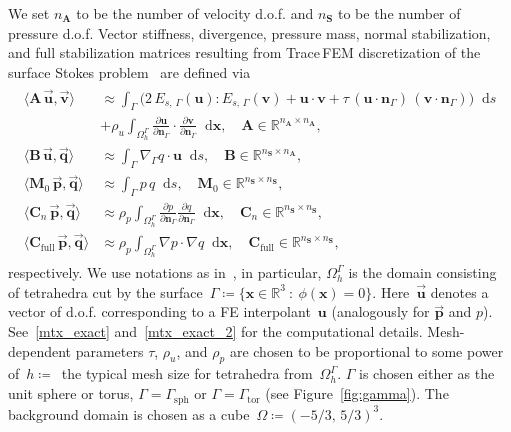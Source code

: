 \documentclass[12pt]{article}
\newcommand{\vect}[1]{\boldsymbol{\mathbf{#1}}}
\newcommand*\diff{\mathop{}\!\mathrm{d}}
\newcommand{\sphere}{{\Gamma_{\text{sph}}}}
\newcommand{\tor}{{\Gamma_{\text{tor}}}}
\begin{document}
We set $n_{\vect A}$ to be the number of velocity d.o.f. and $n_{\vect S}$ to be the number of pressure d.o.f. Vector stiffness, divergence, pressure mass, normal stabilization, and full stabilization matrices resulting from Trace\,FEM discretization of the surface Stokes problem~\cite{surfstokes} are defined via
\begin{align}\begin{split}\label{mtx}
	\langle \vect A\,\vec{\vect u}, \vec{\vect v} \rangle &\approx 
		\int_{\Gamma} \big( 2\,E_{s,\,\Gamma}(\vect u) : E_{s,\,\Gamma}(\vect v) + \vect u\cdot\vect v + \tau\,(\vect u\cdot\vect n_\Gamma)\,(\vect v\cdot\vect n_\Gamma) \big) \diff{s} \\
	&+ 
		\rho_u \int_{\Omega_h^{\Gamma}} \frac{\partial \vect u}{\partial\vect n_\Gamma}\cdot\frac{\partial \vect v}{\partial\vect n_\Gamma} \diff{\vect x}, \quad \vect A \in \mathbb R^{n_{\vect A} \times n_{\vect A}},\\
	\langle \vect B\,\vec{\vect u}, \vec{\vect q} \rangle &\approx 
		\int_{\Gamma} \nabla_\Gamma q \cdot \vect u \diff{s}, \quad \vect B \in \mathbb R^{n_{\vect S} \times n_{\vect A}},\\
	\langle \vect M_0\,\vec{\vect p}, \vec{\vect q} \rangle &\approx
		\int_{\Gamma} p\,q \diff{s}, \quad \vect M_0 \in \mathbb R^{n_{\vect S} \times n_{\vect S}},\\
	\langle \vect C_n\,\vec{\vect p}, \vec{\vect q} \rangle &\approx
		\rho_p \int_{\Omega^{\Gamma}_h} \frac{\partial p}{\partial\vect n_\Gamma} \frac{\partial q}{\partial\vect n_\Gamma} \diff{\vect x}, \quad \vect C_n \in \mathbb R^{n_{\vect S} \times n_{\vect S}},\\
	\langle \vect C_{\text{full}}\,\vec{\vect p}, \vec{\vect q} \rangle &\approx
		\rho_p \int_{\Omega^{\Gamma}_h} \nabla p \cdot \nabla q \diff{\vect x}, \quad \vect C_{\text{full}} \in \mathbb R^{n_{\vect S} \times n_{\vect S}},		 
\end{split}\end{align}
respectively. We use notations as in~\cite{surfstokes}, in particular, $\Omega^\Gamma_h$ is the domain consisting of tetrahedra cut by the surface~$\Gamma \coloneqq \{ \vect x \in \mathbb{R}^3\::\:\phi(\vect x) = 0\}$. Here~$\vec{\vect u}$ denotes a vector of d.o.f. corresponding to a FE interpolant~$\vect u$ (analogously for $\vec{\vect p}$ and $p$). See~\eqref{mtx_exact} and~\eqref{mtx_exact_2} for the computational details. Mesh-dependent parameters $\tau$, $\rho_u$, and $\rho_p$ are chosen to be proportional to some power of~$h \coloneqq$~the typical mesh size for tetrahedra from~$\Omega^{\Gamma}_h$. $\Gamma$ is chosen either as the unit sphere or torus, $\Gamma = \sphere$ or $\Gamma = \tor$ (see Figure~\ref{fig:gamma}). The background domain is chosen as a cube~$\Omega \coloneqq (-5/3,\,5/3)^3$.
\end{document}
